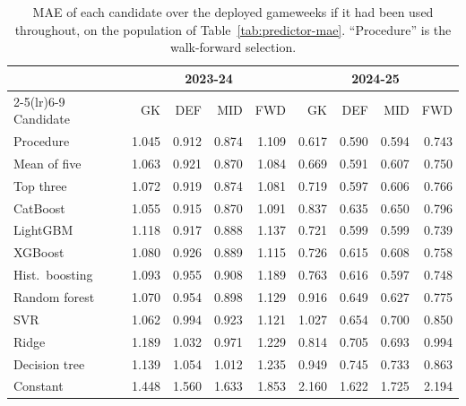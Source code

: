 \documentclass[12pt,oneside,a4paper]{book}
\theoremstyle{definition}
\theoremstyle{remark}
\begin{document}
	\begin{table}[ht]
		\centering
		\caption{MAE of each candidate over the deployed gameweeks if it had been used throughout,
			on the population of Table~\ref{tab:predictor-mae}. ``Procedure'' is the walk-forward
			selection.}
		\label{tab:predictor-candidates}
		\small
		\setlength{\tabcolsep}{4pt}
		\begin{tabular}{lrrrrrrrr}
			\toprule
			& \multicolumn{4}{c}{2023-24} & \multicolumn{4}{c}{2024-25} \\
			\cmidrule(lr){2-5}\cmidrule(lr){6-9}
			Candidate & GK & DEF & MID & FWD & GK & DEF & MID & FWD \\
			\midrule
			Procedure          & 1.045 & 0.912 & 0.874 & 1.109 & 0.617 & 0.590 & 0.594 & 0.743 \\
			\midrule
			Mean of five       & 1.063 & 0.921 & 0.870 & 1.084 & 0.669 & 0.591 & 0.607 & 0.750 \\
			Top three          & 1.072 & 0.919 & 0.874 & 1.081 & 0.719 & 0.597 & 0.606 & 0.766 \\
			CatBoost           & 1.055 & 0.915 & 0.870 & 1.091 & 0.837 & 0.635 & 0.650 & 0.796 \\
			LightGBM           & 1.118 & 0.917 & 0.888 & 1.137 & 0.721 & 0.599 & 0.599 & 0.739 \\
			XGBoost            & 1.080 & 0.926 & 0.889 & 1.115 & 0.726 & 0.615 & 0.608 & 0.758 \\
			Hist.\ boosting    & 1.093 & 0.955 & 0.908 & 1.189 & 0.763 & 0.616 & 0.597 & 0.748 \\
			Random forest      & 1.070 & 0.954 & 0.898 & 1.129 & 0.916 & 0.649 & 0.627 & 0.775 \\
			SVR                & 1.062 & 0.994 & 0.923 & 1.121 & 1.027 & 0.654 & 0.700 & 0.850 \\
			Ridge              & 1.189 & 1.032 & 0.971 & 1.229 & 0.814 & 0.705 & 0.693 & 0.994 \\
			Decision tree      & 1.139 & 1.054 & 1.012 & 1.235 & 0.949 & 0.745 & 0.733 & 0.863 \\
			Constant           & 1.448 & 1.560 & 1.633 & 1.853 & 2.160 & 1.622 & 1.725 & 2.194 \\
			\bottomrule
		\end{tabular}
	\end{table}
\end{document}
